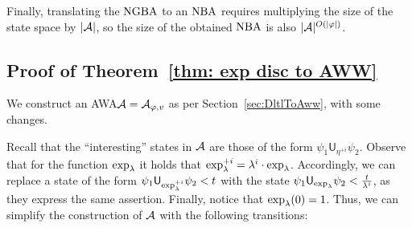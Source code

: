 \documentclass{llncs}
\newcommand{\Until}{\mathsf{U}}
\newcommand{\NGBW}{\mbox{\rm NGBA}\xspace}
\newcommand{\NBW}{\mbox{\rm NBA}\xspace}
\newcommand{\AWW}{\mbox{\rm AWA}\xspace}
\newcommand{\A}{{\cal A}}
\renewcommand{\phi}{\varphi}
\newcommand{\df}{\eta}
\begin{document}
Finally, translating the $\NGBW$ to an $\NBW$ requires multiplying the size of the state space by $|\A|$, so the size of the obtained $\NBW$ is also $|\A|^{O(|\phi|)}$.


\subsection{Proof of Theorem~\ref{thm: exp disc to AWW}}
We construct an \AWW $\A=\A_{\phi,v}$ as per Section~\ref{sec:DltlToAww}, with some changes.

Recall that the ``interesting'' states in $\A$ are those of the form $\psi_1\Until_{\df^{+i}}\psi_2$.
Observe that for the function $\exp_{\lambda}$ it holds that $\exp_{\lambda}^{+i}=\lambda^i\cdot \exp_{\lambda}$. Accordingly, we can replace a state of the form $\psi_1\Until_{\dfl{\lambda}^{+i}}\psi_2<t$ with the state $\psi_1\Until_{\dfl{\lambda}}
\psi_2<\frac{t}{\lambda^i}$, as they express the same assertion.
Finally, notice that $\exp_{\lambda}(0)=1$. Thus, we can simplify the construction of $\A$ with the following transitions:
\end{document}

